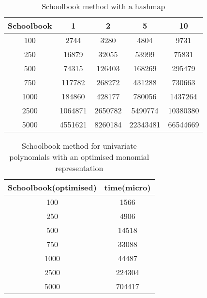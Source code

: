 \begin{table}[h!]
\centering
    \begin{tabular}{|c| c c c c|}
        \hline
        Schoolbook & 1 & 2 & 5 & 10\\
        \hline
        100 & 2744 & 3280 & 4804 & 9731\\
        250 & 16879 & 32055 & 53999 & 75831\\
        500 & 74315 & 126403 & 168269 & 295479\\
        750 & 117782 & 268272 & 431288 & 730663\\
        1000 & 184860 & 428177 & 780056 & 1437264\\
        2500 & 1064871 & 2650782 & 5490774 & 10380380\\
        5000 & 4551621 & 8260184 & 22343481 & 66544669\\
        \hline
    \end{tabular}
    \caption{Schoolbook method with a hashmap}
\end{table}

\begin{table}[h!]
\centering
    \begin{tabular}{|c| c |}
        \hline
        Schoolbook(optimised) & time(micro)\\
        \hline
        100 & 1566 \\
        250 & 4906 \\
        500 & 14518 \\
        750 & 33088 \\
        1000 & 44487 \\
        2500 & 224304 \\
        5000 & 704417 \\
        \hline
    \end{tabular}
    \caption{Schoolbook method for univariate polynomials with an optimised monomial representation}
\end{table}






